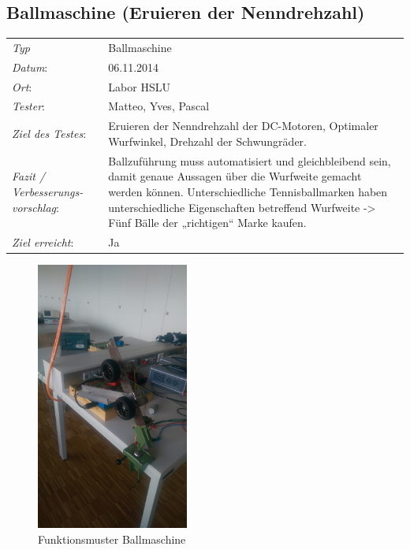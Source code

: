 \subsection{Ballmaschine (Eruieren der Nenndrehzahl)}

\begin{tabular}{p{3.6cm}p{9.4cm}}
\textit{Typ}              & Ballmaschine \\ 
\textit{Datum}:           & 06.11.2014   \\
\textit{Ort}:             & Labor HSLU \\
\textit{Tester}:          & Matteo, Yves, Pascal\\
\textit{Ziel des Testes}: & Eruieren der Nenndrehzahl der DC-Motoren, Optimaler Wurfwinkel, Drehzahl der Schwungräder.  \\
\textit{Fazit / Verbesserungs-\newline vorschlag}: & Ballzuführung muss automatisiert und gleichbleibend sein, damit genaue Aussagen über die Wurfweite gemacht werden können. 
Unterschiedliche Tennisballmarken haben unterschiedliche Eigenschaften betreffend Wurfweite -> Fünf Bälle der „richtigen“ Marke kaufen. \\
\textit{Ziel erreicht}:& Ja\\
\end{tabular}
\begin{figure}[h!]
	\includegraphics[width=5cm]{Funktionstests/Bilder/Ballmaschine_Drehzahl1.jpg}
	\centering
	\caption{Funktionsmuster Ballmaschine} 
\label{abb:Ballmaschine_Drehzahl}
\end{figure}